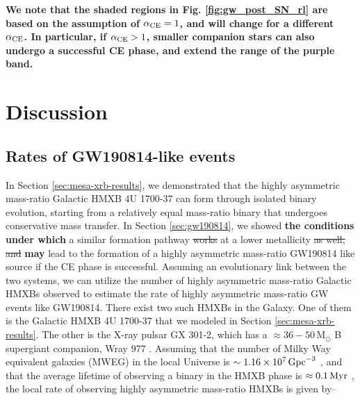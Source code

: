\documentclass[linenumbers,trackchanges,twocolumn]{aastex701}
\newcommand{\Mdot}{\mathrm{M}_{\odot}}
\begin{document}
\textbf{We note that the shaded regions in Fig. \ref{fig:gw_post_SN_rl} are based on the assumption of $\alpha_{\rm CE} = 1$, and will change for a different $\alpha_{\rm CE}$. In particular, if $\alpha_{\rm CE} > 1$, smaller companion stars can also undergo a successful CE phase, and extend the range of the purple band.}

\section{Discussion} \label{sec:discussion}


\subsection{Rates of GW190814-like events}

In Section \ref{sec:mesa-xrb-results}, we demonstrated that the highly asymmetric mass-ratio Galactic HMXB 4U 1700-37 can form through isolated binary evolution, starting from a relatively equal mass-ratio binary that undergoes conservative mass transfer. In Section \ref{sec:gw190814}, we showed \textbf{the conditions under which} a similar formation pathway \sout{works} at a lower metallicity \sout{as well, and} \textbf{may} lead to the formation of a highly asymmetric mass-ratio GW190814 like source if the CE phase is successful. Assuming an evolutionary link between the two systems, we can utilize the number of highly asymmetric mass-ratio Galactic HMXBs observed to estimate the rate of highly asymmetric mass-ratio GW events like GW190814. There exist two such HMXBs in the Galaxy. One of them is the Galactic HMXB 4U 1700-37 that we modeled in Section \ref{sec:mesa-xrb-results}. The other is the X-ray pulsar GX 301-2, which has a $\approx 36-50\,\Mdot$ B supergiant companion, Wray 977 \citep{1995A&A...300..446K}. Assuming that the number of Milky Way equivalent galaxies (MWEG) in the local Universe is $\sim 1.16 \times 10^7 \,\rm{Gpc}^{-3}$ \citep{2008ApJ...675.1459K,2010CQGra..27q3001A}, and that the average lifetime of observing a binary in the HMXB phase is $\approx 0.1\, \rm Myr$ \citep{2023pbse.book.....T}, the local rate of observing highly asymmetric mass-ratio HMXBs is given by--
\end{document}
